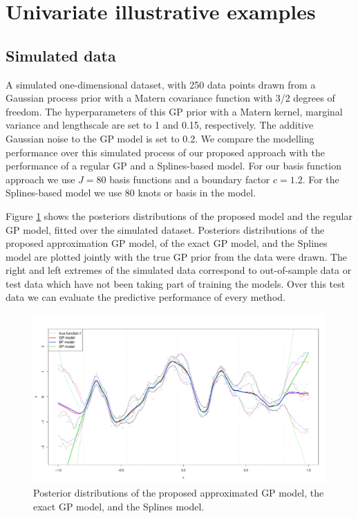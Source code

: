\documentclass[]{interact}
\theoremstyle{plain}%
\theoremstyle{definition}
\theoremstyle{remark}
\begin{document}
\vspace{3mm}
\section{Univariate illustrative examples}\label{sec:gp_examples1D}


\subsection{Simulated data}

A simulated one-dimensional dataset, with 250 data points drawn from a Gaussian process prior with a Matern covariance function with 3/2 degrees of freedom. The hyperparameters of this GP prior with a Matern kernel, marginal variance and lengthscale are set to 1 and 0.15, respectively. The additive Gaussian noise to the GP model is set to 0.2. We compare the modelling performance over this simulated process of our proposed approach with the performance of a regular GP and a Splines-based model. For our basis function approach we use $J=80$ basis functions and a boundary factor $c=1.2$. For the Splines-based model we use 80 knots or basis in the model.

Figure \ref{fig9_Posteriors_exI} shows the posteriors distributions of the proposed model and the regular GP model, fitted over the simulated dataset. Posteriors distributions of the proposed approximation GP model, of the exact GP model, and the Splines model are plotted jointly with the true GP prior from the data were drawn. The right and left extremes of the simulated data correspond to out-of-sample data or test data which have not been taking part of training the models. Over this test data we can evaluate the predictive performance of every method.  

\begin{figure}[H]
\centering
\includegraphics[scale=0.35]{fig9_Posteriors_exI.pdf}
\caption{Posterior distributions of the proposed approximated GP model, the exact GP model, and the Splines model.}
  \label{fig9_Posteriors_exI}
\end{figure}
\end{document}
